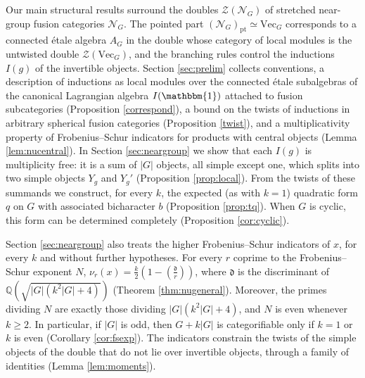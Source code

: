 \documentclass[10pt]{article}
\theoremstyle{plain}
\theoremstyle{definition}
\theoremstyle{plain}
\newcommand{\Jac}[2]{\left(\tfrac{#1}{#2}\right)}
\begin{document}
\par Our main structural results surround the doubles $\mathcal{Z}(\mathcal{N}_G)$ of stretched near-group fusion categories $\mathcal{N}_G$. The pointed part $(\mathcal{N}_G)_\mathrm{pt}\simeq\mathrm{Vec}_G$ corresponds to a connected \'etale algebra $A_G$ in the double whose category of local modules is the untwisted double $\mathcal{Z}(\mathrm{Vec}_G)$, and the branching rules control the inductions $I(g)$ of the invertible objects. Section \ref{sec:prelim} collects conventions, a description of inductions as local modules over the connected \'etale subalgebras of the canonical Lagrangian algebra $I(\mathbbm{1})$ attached to fusion subcategories (Proposition \ref{correspond}), a bound on the twists of inductions in arbitrary spherical fusion categories (Proposition \ref{twist}), and a multiplicativity property of Frobenius--Schur indicators for products with central objects (Lemma \ref{lem:nucentral}). In Section \ref{sec:neargroup} we show that each $I(g)$ is multiplicity free: it is a sum of $|G|$ objects, all simple except one, which splits into two simple objects $Y_g$ and $Y_g'$ (Proposition \ref{prop:local}). From the twists of these summands we construct, for every $k$, the expected (as with $k=1$) quadratic form $q$ on $G$ with associated bicharacter $b$ (Proposition \ref{prop:tq}). When $G$ is cyclic, this form can be determined completely (Proposition \ref{cor:cyclic}).

\par Section \ref{sec:neargroup} also treats the higher Frobenius--Schur indicators of $x$, for every $k$ and without further hypotheses. For every $r$ coprime to the Frobenius--Schur exponent $N$, $\nu_r(x)=\frac{k}{2}(1-\Jac{\mathfrak{d}}{r})$, where $\mathfrak{d}$ is the discriminant of $\mathbb{Q}(\sqrt{|G|(k^2|G|+4)})$ (Theorem \ref{thm:nugeneral}). Moreover, the primes dividing $N$ are exactly those dividing $|G|(k^2|G|+4)$, and $N$ is even whenever $k\geq2$. In particular, if $|G|$ is odd, then $G+k|G|$ is categorifiable only if $k=1$ or $k$ is even (Corollary \ref{cor:fsexp}). The indicators constrain the twists of the simple objects of the double that do not lie over invertible objects, through a family of identities (Lemma \ref{lem:moments}).
\end{document}
